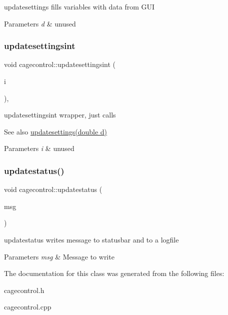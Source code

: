 updatesettings fills variables with data from G\+UI 


\begin{DoxyParams}{Parameters}
{\em d} & unused \\
\hline
\end{DoxyParams}
\mbox{\label{classcagecontrol_a2cfb7b65a7b8838d5f2acaa384a7cfcc}} 
\subsubsection{\texorpdfstring{updatesettingsint}{updatesettingsint}}
{\footnotesize\ttfamily void cagecontrol\+::updatesettingsint (\begin{DoxyParamCaption}\item[{int}]{i }\end{DoxyParamCaption})\hspace{0.3cm}{\ttfamily [private]}, {\ttfamily [slot]}}



updatesettingsint wrapper, just calls 

\begin{DoxySeeAlso}{See also}
\hyperlink{classcagecontrol_a244c02598b4b73db82b5852561634084}{updatesettings(double d)} 
\end{DoxySeeAlso}

\begin{DoxyParams}{Parameters}
{\em i} & unused \\
\hline
\end{DoxyParams}
\mbox{\label{classcagecontrol_aab3dedc2c4b814569988c93bd30546c7}} 
\subsubsection{\texorpdfstring{updatestatus()}{updatestatus()}}
{\footnotesize\ttfamily void cagecontrol\+::updatestatus (\begin{DoxyParamCaption}\item[{Q\+String}]{msg }\end{DoxyParamCaption})\hspace{0.3cm}{\ttfamily [private]}}



updatestatus writes message to statusbar and to a logfile 


\begin{DoxyParams}{Parameters}
{\em msg} & Message to write \\
\hline
\end{DoxyParams}


The documentation for this class was generated from the following files\+:\begin{DoxyCompactItemize}
\item 
cagecontrol.\+h\item 
cagecontrol.\+cpp\end{DoxyCompactItemize}

